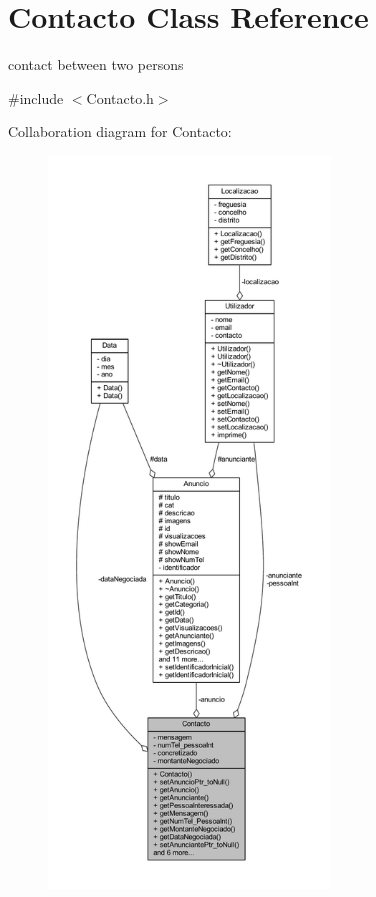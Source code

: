 \hypertarget{class_contacto}{}\section{Contacto Class Reference}
\label{class_contacto}


contact between two persons  




{\ttfamily \#include $<$Contacto.\+h$>$}



Collaboration diagram for Contacto\+:
\nopagebreak
\begin{figure}[H]
\begin{center}
\leavevmode
\includegraphics[height=550pt]{class_contacto__coll__graph}
\end{center}
\end{figure}
